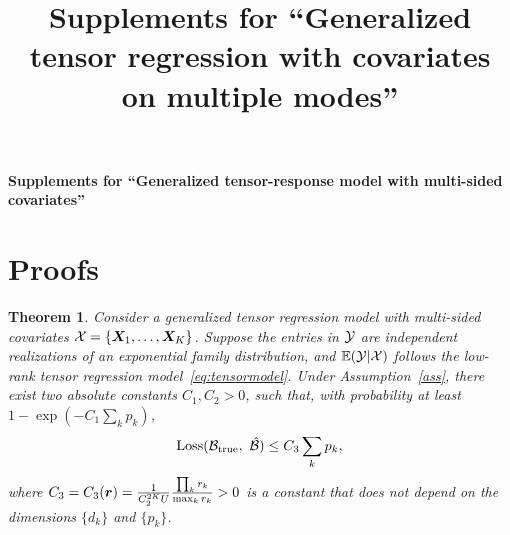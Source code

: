 \documentclass[11pt]{article}
\title{Supplements for ``Generalized tensor regression with covariates on multiple modes''}
\theoremstyle{plain}
\newtheorem{thm}{Theorem}[section]
\theoremstyle{definition}
\begin{document}
\begin{center}
\begin{spacing}{1.5}
\textbf{\Large Supplements for ``Generalized tensor-response model with multi-sided covariates''}
\end{spacing}
\end{center}

\section{Proofs}
\begin{thm}
Consider a generalized tensor regression model with multi-sided covariates $\mathcal{X}=\{\bm X_1,\ldots,\bm X_K\}$. Suppose the entries in $\mathcal{Y}$ are independent realizations of an exponential family distribution, and $\mathbb{E}(\mathcal{Y}|\mathcal{X})$ follows the low-rank tensor regression model~\eqref{eq:tensormodel}. Under Assumption~\ref{ass}, there exist two absolute constants $C_1, C_2>0$, such that, with probability at least $1-\exp(-C_1\sum_k p_k)$, 
\begin{equation}\label{eq:bound}
\text{Loss}(\mathcal{B}_{\text{true}},\ \hat {\mathcal{B}}) \leq C_3\sum_k p_k,
\end{equation}
where $C_3=C_3(\bm{r})={1\over C^{2K}_2U}{\prod_k r_k \over \max_k r_k}>0$ is a constant that does not depend on the dimensions $\{d_k\}$ and $\{p_k\}$. 
\end{thm}
\end{document}
